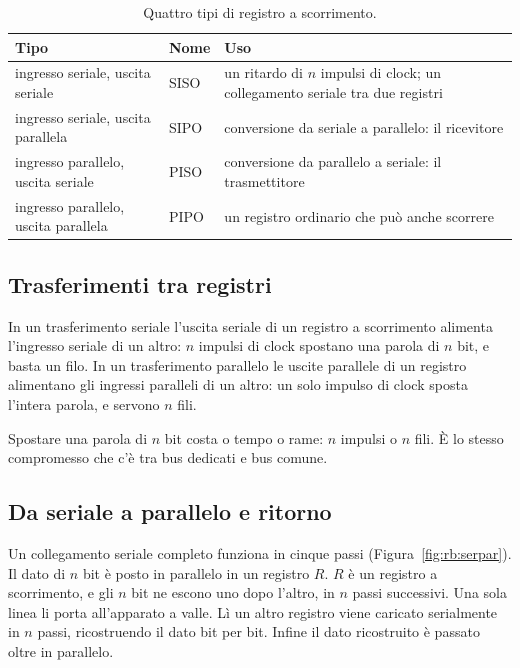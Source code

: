 \begin{table}[htb]
\centering\small
\caption{Quattro tipi di registro a scorrimento.}\label{tab:rb:four}
\begin{tabularx}{\textwidth}{@{}llL@{}}
\toprule
\textbf{Tipo} & \textbf{Nome} & \textbf{Uso}\\
\midrule
ingresso seriale, uscita seriale & SISO & un ritardo di $n$ impulsi di clock; un collegamento seriale tra due registri\\
ingresso seriale, uscita parallela & SIPO & conversione da seriale a parallelo: il ricevitore\\
ingresso parallelo, uscita seriale & PISO & conversione da parallelo a seriale: il trasmettitore\\
ingresso parallelo, uscita parallela & PIPO & un registro ordinario che può anche scorrere\\
\bottomrule
\end{tabularx}
\end{table}

\subsection{Trasferimenti tra registri}

In un trasferimento seriale l'uscita seriale di un registro a scorrimento
alimenta l'ingresso seriale di un altro: $n$ impulsi di clock spostano una
parola di $n$ bit, e basta un filo. In un trasferimento parallelo le uscite
parallele di un registro alimentano gli ingressi paralleli di un altro: un solo
impulso di clock sposta l'intera parola, e servono $n$ fili.

\begin{prgconcept}
Spostare una parola di $n$ bit costa o tempo o rame: $n$ impulsi o $n$ fili. È
lo stesso compromesso che c'è tra bus dedicati e bus comune.
\end{prgconcept}

\subsection{Da seriale a parallelo e ritorno}

Un collegamento seriale completo funziona in cinque passi
(Figura~\ref{fig:rb:serpar}). Il dato di $n$ bit è posto in parallelo in un
registro $R$. $R$ è un registro a scorrimento, e gli $n$ bit ne escono uno dopo
l'altro, in $n$ passi successivi. Una sola linea li porta all'apparato a valle.
Lì un altro registro viene caricato serialmente in $n$ passi, ricostruendo il
dato bit per bit. Infine il dato ricostruito è passato oltre in parallelo.

